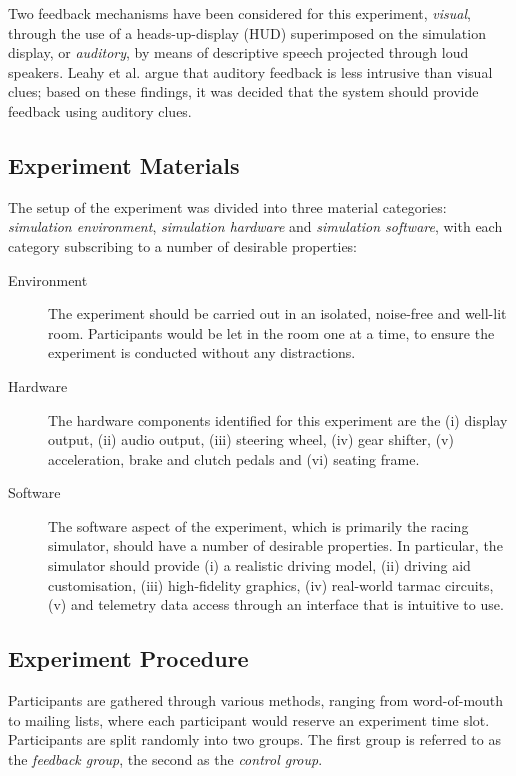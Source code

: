 \documentclass{sig-alternate}
\begin{document}
Two feedback mechanisms have been considered for this experiment, \emph{visual}, through the use of a heads-up-display (HUD) superimposed on the simulation display, or \emph{auditory}, by means of descriptive speech projected through loud speakers. Leahy et al. \cite{leahy2003auditory} argue that auditory feedback is less intrusive than visual clues; based on these findings, it was decided that the system should provide feedback using auditory clues.

\subsection{Experiment Materials}
The setup of the experiment was divided into three material categories: \emph{simulation environment}, \emph{simulation hardware} and \emph{simulation software}, with each category subscribing to a number of desirable properties:

\begin{description}
	\item [Environment] The experiment should be carried out in an isolated, noise-free and well-lit room. Participants would be let in the room one at a time, to ensure the experiment is conducted without any distractions.
	\item [Hardware] The hardware components identified for this experiment are the (i) display output, (ii) audio output, (iii) steering wheel, (iv) gear shifter, (v) acceleration, brake and clutch pedals and (vi) seating frame.
	\item [Software] The software aspect of the experiment, which is primarily the racing simulator, should have a number of desirable properties. In particular, the simulator should provide (i) a realistic driving model, (ii) driving aid customisation, (iii) high-fidelity graphics, (iv) real-world tarmac circuits, (v) and telemetry data access through an interface that is intuitive to use.
\end{description}

\subsection{Experiment Procedure}
Participants are gathered through various methods, ranging from word-of-mouth to mailing lists, where each participant would reserve an experiment time slot. Participants are split randomly into two groups. The first group is referred to as the \emph{feedback group}, the second as the \emph{control group}.
\end{document}
